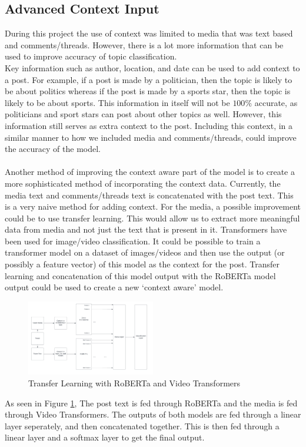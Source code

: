\subsection{Advanced Context Input}
During this project the use of context was limited to media that was text based and comments/threads. However, there is a lot more information that can
be used to improve accuracy of topic classification.\\
Key information such as author, location, and date can be used to add context to a post. For example, if a post is made by a politician, then the topic is
likely to be about politics whereas if the post is made by a sports star, then the topic is likely to be about sports. This information in itself will not
be $100\%$ accurate, as politicians and sport stars can post about other topics as well. However, this information still serves as extra context to the post.
Including this context, in a similar manner to how we included media and comments/threads, could improve the accuracy of the model.\\\\
Another method of improving the context aware part of the model is to create a more sophisticated method of incorporating the context data. Currently, the
media text and comments/threads text is concatenated with the post text. This is a very naive method for adding context. For the media, a possible improvement
could be to use transfer learning. This would allow us to extract more meaningful data from media and not just the text that is present in it. Transformers
have been used for image/video classification. It could be possible to train a transformer model on a dataset of images/videos
and then use the output (or possibly a feature vector) of this model as the context for the post. Transfer learning and 
concatenation of this model output with the RoBERTa model output could be used to create a new `context aware' model.
\begin{figure}
    \centering
    \includegraphics[width=0.5\textwidth]{images/transfer-learning.png}
    \caption{Transfer Learning with RoBERTa and Video Transformers}
    \label{fig:transfer-learning}
\end{figure}
As seen in Figure \ref{fig:transfer-learning}, The post text is fed through RoBERTa and the media is fed through Video Transformers. The outputs of both models
are fed through a linear layer seperately, and then concatenated together. This is then fed through a linear layer and a softmax layer to get the final output.
